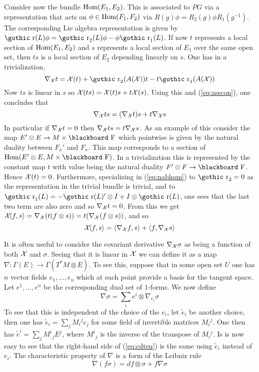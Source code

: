 \documentclass[12pt,titlepage]{article}
\def\bbf#1{\hbox{\blackboard #1}}
\def\goth#1{\hbox{\gothic #1}}
\def\lF{\bbf F}
\def\cX{{\cal X}}
\def\gr{{\goth r}}
\def\Hom{\hbox{Hom}}
\begin{document}
Consider now the bundle \(\Hom(E_1,E_2)\). This is associated to \(PG\)
via a representation that acts on \(\phi\in\Hom(F_1,F_2)\) via
\(R(g)\phi = R_2(g)\phi R_1(g^{-1})\). The corresponding Lie algebra
representation is given by \(\gr(L)\phi = \gr_2(L)\phi - \phi\gr_1(L)\).
If now \(t\) represents a local section of \(\Hom(E_1,E_2)\) and \(s\)
represents a local section of \(E_1\) over the same open set, then
\(ts\) is a local section of \(E_2\) depending linearly on \(s\).
One has in a  trivialization,
\begin{equation}\label{eq:nabhom}%
\nabla_\cX t=\cX(t)+ \gr_2(A (\cX))t-t\gr_1(A (\cX))
\end{equation}%
Now
\(ts\) is linear in \(s\) so \(\cX(ts)=\cX(t)s + t\cX(s)\).
Using this and (\ref{eq:asscon}), one concludes that
\begin{equation}\label{eq:cdts}
\nabla_\cX ts =(\nabla_\cX t)s+t\nabla_\cX s
\end{equation}
In particular if
\(\nabla_\cX t=0\)
then \(\nabla_\cX ts = t\nabla_\cX s\).  As an example of this consider
the map \(E'\otimes E \to M\times \lF\) which pointwise is given by the
natural duality between \(F_x'\) and \(F_x\). This map corresponds to a
section of \(\Hom(E'\otimes E, M\times \lF)\). In a 
trivialization this is represented by the constant map \(t\)
with value being the natural duality \(F'\otimes F\to \lF\). Hence
\(\cX(t)=0\). Furthermore, specializing in (\ref{eq:nabhom}) to
\(\gr_2=0\) as the representation in the trivial bundle is trivial,
and to \(\gr_1(L)=-\gr(L)'\otimes I + I\otimes\gr(L)\), 
 one sees that the
last two term are also zero and so
 \(\nabla_\cX t=0\). From this we get
 \(\cX\!\langle f,s \rangle =\nabla_\cX (t(f\otimes s)) =
t(\nabla_\cX(f\otimes s))\), and so \[
\cX\!\langle f,s\rangle =
\langle\nabla_\cX f,s\rangle + \langle f,\nabla_\cX s \rangle
\]



It is often useful to consider the covariant derivative
\(\nabla_\cX\sigma\) as being a function of both \(\cX\) and \(\sigma\).
Seeing that it is linear in \(\cX\)  we can define it as a
map \(\nabla:\Gamma(E)\to\Gamma(T^*M\otimes E)\). 
%
To see this, suppose that in some open set \(U\) one has  \(n\)
 vector
fields \(e_1,\dots,e_n\) which at each point provide a basis for the
tangent space. Let \(e^1,\dots,e^n\) be the corresponding dual set
of \(1\)-forms. We now define 
 \begin{equation}\label{eq:cdten}%
\nabla\sigma=\sum_ie^i\otimes\nabla_{e_i}\sigma
\end{equation}%
To see that this is independent of the choice of the \(e_i\), let
\(\tilde e_i\) be another choice, then one has 
\(\tilde e_i=\sum_jM_i{}^je_j\) for some field of invertible matrices
\(M_i{}^j\). One then has \(\tilde e^i = \sum_jM^i{}_jE^j\), where
\(M^i{}_j\) is the inverse of the transpose of \(M_i{}^j\). 
Is is now easy to see
that the right-hand side of (\ref{eq:cdten}) is the same using 
\(\tilde e_i\) instead of \(e_i\).
The characteristic property of
\(\nabla\) is a form of the Leibniz rule
\[
\nabla(f\sigma)=df\otimes\sigma+f\nabla\sigma
\]
\end{document}
